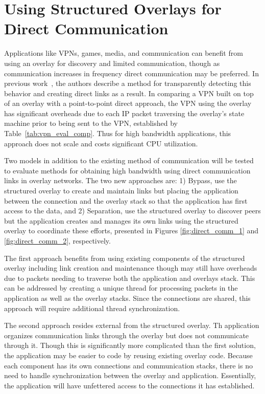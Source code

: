 \section{Using Structured Overlays for Direct Communication}
\label{direct_communication}
Applications like VPNs, games, media, and communication can benefit from using
an overlay for discovery and limited communication, though as communication
increases in frequency direct communication may be preferred.  In previous
work~\cite{wow}, the authors describe a method for transparently detecting this
behavior and creating direct links as a result.  In comparing a VPN built on
top of an overlay with a point-to-point direct approach, the VPN using the
overlay has significant overheads due to each IP packet traversing the overlay's
state machine prior to being sent to the VPN, established by
Table~\ref{tab:vpn_eval_comp}.  Thus for high bandwidth applications, this
approach does not scale and costs significant CPU utilization.

Two models in addition to the existing method of communication will be tested
to evaluate methods for obtaining high bandwidth using direct communication
links in overlay networks.  The two new approaches are:  1) Bypass, use the
structured overlay to create and maintain links but placing the application
between the connection and the overlay stack so that the application has first
access to the data, and 2) Separation, use the structured overlay to discover
peers but the application creates and manages its own links using the structured
overlay to coordinate these efforts, presented in Figures \ref{fig:direct_comm_1}
and \ref{fig:direct_comm_2}, respectively.

The first approach benefits from using existing components of the structured
overlay including link creation and maintenance though may still have overheads
due to packets needing to traverse both the application and overlays stack.
This can be addressed by creating a unique thread for processing packets in the
application as well as the overlay stacks.  Since the connections are shared,
this approach will require additional thread synchronization.

The second approach resides external from the structured overlay.  Th
application organizes communication links through the overlay but does not
communicate through it.  Though this is significantly more complicated than the
first solution, the application may be easier to code by reusing existing
overlay code.  Because each component has its own connections and communication
stacks, there is no need to handle synchronization between the overlay and
application.  Essentially, the application will have unfettered access to the
connections it has established.

